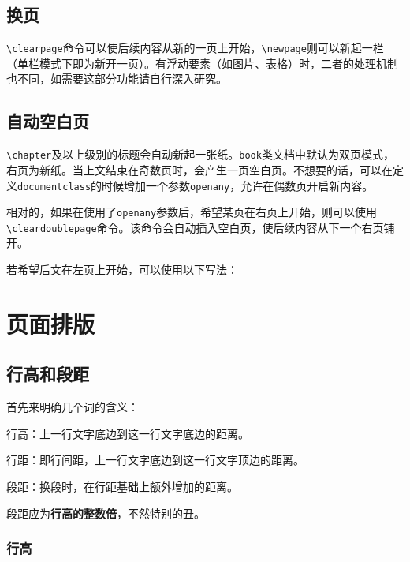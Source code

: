 \documentclass[10pt,openany]{book}
\begin{document}


\section{换页}

\texttt{\textbackslash{}clearpage}命令可以使后续内容从新的一页上开始，\texttt{\textbackslash{}newpage}则可以新起一栏（单栏模式下即为新开一页）。有浮动要素（如图片、表格）时，二者的处理机制也不同，如需要这部分功能请自行深入研究。

\section{自动空白页}

\texttt{\textbackslash{}chapter}及以上级别的标题会自动新起一张纸。\texttt{book}类文档中默认为双页模式，右页为新纸。当上文结束在奇数页时，会产生一页空白页。不想要的话，可以在定义\texttt{documentclass}的时候增加一个参数\texttt{openany}，允许在偶数页开启新内容。



相对的，如果在使用了\texttt{openany}参数后，希望某页在右页上开始，则可以使用\texttt{\textbackslash{}cleardoublepage}命令。该命令会自动插入空白页，使后续内容从下一个右页铺开。

若希望后文在左页上开始，可以使用以下写法：



\chapter{页面排版}

\section{行高和段距}

首先来明确几个词的含义：

行高：上一行文字底边到这一行文字底边的距离。

行距：即行间距，上一行文字底边到这一行文字顶边的距离。

段距：换段时，在行距基础上额外增加的距离。

段距应为\textbf{行高的整数倍}，不然特别的丑。

\subsection{行高}
\end{document}
